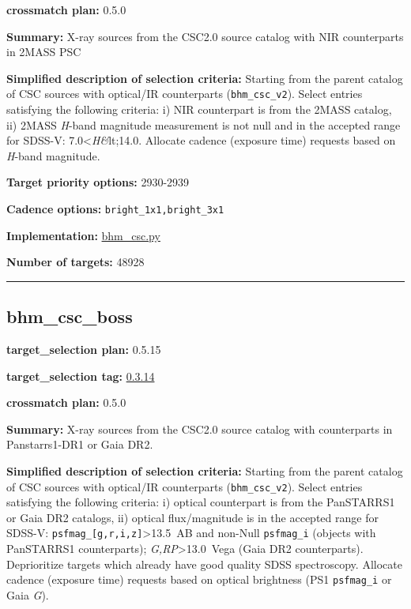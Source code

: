 \noindent\textbf{crossmatch plan:} 0.5.0

\noindent\textbf{Summary:} X-ray sources from the CSC2.0 source catalog with NIR
counterparts in 2MASS PSC

\noindent\textbf{Simplified description of selection criteria:} Starting from the
parent catalog of CSC sources with optical/IR counterparts
(\texttt{bhm\_csc\_v2}). Select entries satisfying the following
criteria: i) NIR counterpart is from the 2MASS catalog, ii) 2MASS
\emph{H}-band magnitude measurement is not null and in the accepted
range for SDSS-V: 7.0\textless{}\emph{H\&}lt;14.0. Allocate cadence
(exposure time) requests based on \emph{H}-band magnitude.


\noindent\textbf{Target priority options:} 2930-2939

\noindent\textbf{Cadence options:} \texttt{bright\_1x1,bright\_3x1}

\noindent\textbf{Implementation:}
\href{https://github.com/sdss/target_selection/blob/0.3.14/python/target_selection/cartons/bhm_csc.py}{bhm\_csc.py}

\noindent\textbf{Number of targets:} 48928

\begin{center}\rule{0.5\linewidth}{0.5pt}\end{center}

\hypertarget{bhm_csc_boss_plan0.5.15}{%
\subsection{bhm\_csc\_boss}\label{bhm_csc_boss_plan0.5.15}}

\noindent\textbf{target\_selection plan:} 0.5.15

\noindent\textbf{target\_selection tag:}
\href{https://github.com/sdss/target_selection/tree/0.3.14/}{0.3.14}

\noindent\textbf{crossmatch plan:} 0.5.0

\noindent\textbf{Summary:} X-ray sources from the CSC2.0 source catalog with
counterparts in Panstarrs1-DR1 or Gaia DR2.

\noindent\textbf{Simplified description of selection criteria:} Starting from the
parent catalog of CSC sources with optical/IR counterparts
(\texttt{bhm\_csc\_v2}). Select entries satisfying the following
criteria: i) optical counterpart is from the PanSTARRS1 or Gaia DR2
catalogs, ii) optical flux/magnitude is in the accepted range for
SDSS-V: \texttt{psfmag\_{[}g,r,i,z{]}}\textgreater13.5~AB and non-Null
\texttt{psfmag\_i} (objects with PanSTARRS1 counterparts);
\emph{G,RP}\textgreater13.0~Vega (Gaia DR2 counterparts). Deprioritize
targets which already have good quality SDSS spectroscopy. Allocate
cadence (exposure time) requests based on optical brightness (PS1
\texttt{psfmag\_i} or Gaia \emph{G}).



